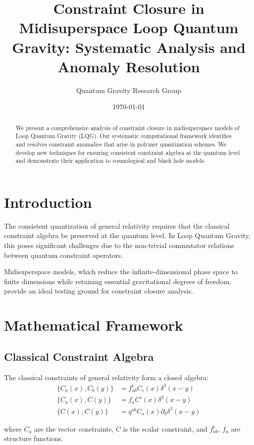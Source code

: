 \documentclass[11pt]{article}
\title{Constraint Closure in Midisuperspace Loop Quantum Gravity: Systematic Analysis and Anomaly Resolution}
\author{Quantum Gravity Research Group}
\date{\today}
\begin{document}
\maketitle

\begin{abstract}
We present a comprehensive analysis of constraint closure in midisuperspace models of Loop Quantum Gravity (LQG). Our systematic computational framework identifies and resolves constraint anomalies that arise in polymer quantization schemes. We develop new techniques for ensuring consistent constraint algebra at the quantum level and demonstrate their application to cosmological and black hole models.
\end{abstract}

\section{Introduction}

The consistent quantization of general relativity requires that the classical constraint algebra be preserved at the quantum level. In Loop Quantum Gravity, this poses significant challenges due to the non-trivial commutator relations between quantum constraint operators.

Midisuperspace models, which reduce the infinite-dimensional phase space to finite dimensions while retaining essential gravitational degrees of freedom, provide an ideal testing ground for constraint closure analysis.

\section{Mathematical Framework}

\subsection{Classical Constraint Algebra}

The classical constraints of general relativity form a closed algebra:
\begin{align}
\{C_a(x), C_b(y)\} &= f_{ab}^c C_c(x) \delta^3(x-y) \\
\{C_a(x), C(y)\} &= f_a C'(x) \delta^3(x-y) \\
\{C(x), C(y)\} &= q^{ab} C_a(x) \partial_b \delta^3(x-y)
\end{align}

where $C_a$ are the vector constraints, $C$ is the scalar constraint, and $f_{ab}^c$, $f_a$ are structure functions.
\end{document}
